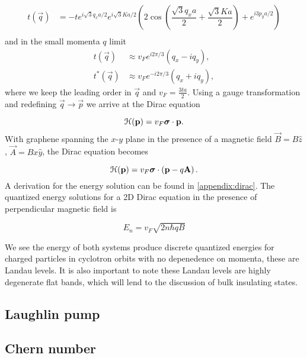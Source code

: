 \begin{align}
  t(\vec{q}) &= -t e^{i\sqrt{3} q_x a / 2} e^{i\sqrt{3} K a / 2} \left( 2\cos{\left( \dfrac{\sqrt{3} q_x a }{2}  + \dfrac{\sqrt{3} K a}{2} \right)} + e^{i 3 p_y a /2 } \right) \nonumber \\
\end{align}
and in the small momenta $q$ limit
\begin{align}
  t(\vec{q}) &\approx v_F e^{i 2\pi/3} \left(q_x - iq_y \right), \nonumber \\
  t^*(\vec{q}) &\approx v_F e^{-i 2\pi/3} \left(q_x + iq_y \right), \nonumber
\end{align}
where we keep the leading order in $\vec{q}$ and $v_F = \tfrac{3ta}{2}$.
Using a gauge transformation and redefining $\vec{q} \rightarrow \vec{p}$ we arrive at the Dirac equation

\begin{equation}
  \mathcal{H}(\mathbf{p}) = v_F \bm{\sigma}\cdot \mathbf{p}.
\end{equation}
With graphene spanning the $x$-$y$ plane in the presence of a magnetic field $\vec{B} = B\hat{z}$, $\vec{A} =  Bx\hat{y}$, the Dirac equation becomes

\begin{equation}
  \mathcal{H}(\mathbf{p}) = v_F \bm{\sigma}\cdot \left(\mathbf{p} - q\mathbf{A} \right).
\end{equation}
A derivation for the energy solution can be found in \ref{appendix:dirac}.
The quantized energy solutions for a 2D Dirac equation in the presence of perpendicular magnetic field is

\begin{equation}
  E_n = v_F \sqrt{2 n \hbar qB }
\end{equation}

We see the energy of both systems produce discrete quantized energies for charged particles in cyclotron orbits with no depenedence on momenta, these are Landau levels.
It is also important to note these Landau levels are highly degenerate flat bands, which will lend to the discussion of bulk insulating states.

\subsection{Laughlin pump}

\subsection{Chern number}

